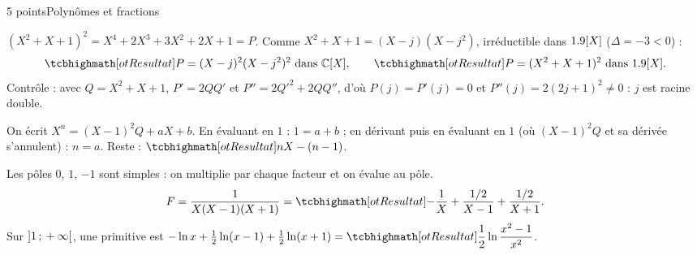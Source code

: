 \begin{corrigeEval}{5 points}{Polynômes et fractions}
\begin{questions}
  \item $(X^{2}+X+1)^{2}=X^{4}+2X^{3}+3X^{2}+2X+1=P$. Comme
    $X^{2}+X+1=(X-j)(X-j^{2})$, irréductible dans $1.9[X]$ ($\Delta=-3<0$) :
    \[\res{P=(X-j)^{2}(X-j^{2})^{2}\ \text{dans }\Cx[X]},\qquad
      \res{P=(X^{2}+X+1)^{2}\ \text{dans }\R[X]}.\]
    Contrôle : avec $Q=X^{2}+X+1$, $P'=2QQ'$ et $P''=2Q'^{2}+2QQ''$, d'où
    $P(j)=P'(j)=0$ et $P''(j)=2(2j+1)^{2}\neq0$ : $j$ est racine double.
  \item On écrit $X^{n}=(X-1)^{2}Q+aX+b$. En évaluant en $1$ : $1=a+b$ ; en
    dérivant puis en évaluant en $1$ (où $(X-1)^{2}Q$ et sa dérivée
    s'annulent) : $n=a$. Reste : $\res{nX-(n-1)}$. 
  \item Les pôles $0$, $1$, $-1$ sont simples : on multiplie par chaque
    facteur et on évalue au pôle.
    \[F=\frac{1}{X(X-1)(X+1)}=\res{-\frac1X+\frac{1/2}{X-1}+\frac{1/2}{X+1}}.\]
    Sur $\mathopen{]}1\,{;}\,+\infty\mathclose{[}$, une primitive est
    $-\ln x+\frac12\ln(x-1)+\frac12\ln(x+1)=\res{\dfrac12\ln\dfrac{x^{2}-1}{x^{2}}}$.
\end{questions}
\end{corrigeEval}
